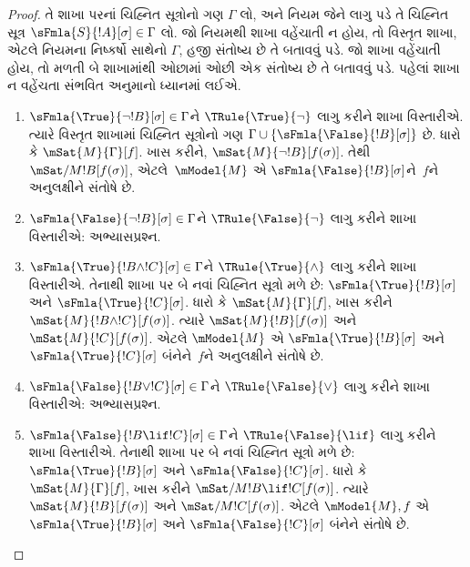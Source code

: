 \begin{proof}
તે શાખા પરનાં ચિહ્નિત સૂત્રોનો ગણ $\Gamma$ લો, અને નિયમ
જેને લાગુ પડે તે ચિહ્નિત સૂત્ર
$\sFmla{S}{!A}[\sigma] \in \Gamma$ લો. જો નિયમથી શાખા
વહેંચાતી ન હોય, તો વિસ્તૃત શાખા, એટલે નિયમના નિષ્કર્ષો સાથેનો
$\Gamma$, હજી સંતોષ્ય છે તે બતાવવું પડે. જો શાખા વહેંચાતી
હોય, તો મળતી બે શાખામાંથી ઓછામાં ઓછી એક સંતોષ્ય છે તે બતાવવું
પડે.
પહેલાં શાખા ન વહેંચતા સંભવિત અનુમાનો ધ્યાનમાં લઈએ.
\begin{enumerate}
\item $\sFmla{\True}{\lnot !B}[\sigma] \in \Gamma$ને
  $\TRule{\True}{\lnot}$ લાગુ કરીને શાખા વિસ્તારીએ. ત્યારે
  વિસ્તૃત શાખામાં ચિહ્નિત સૂત્રોનો ગણ $\Gamma \cup
  \{\sFmla{\False}{!B}[\sigma]\}$ છે. ધારો કે
  $\mSat{M}{\Gamma}[f]$. ખાસ કરીને,
  $\mSat{M}{\lnot !B}[f(\sigma)]$. તેથી
  $\mSat/{M}{!B}[f(\sigma)]$, એટલે~$\mModel{M}$ એ
  $\sFmla{\False}{!B}[\sigma]$ને~$f$ને અનુલક્ષીને સંતોષે છે.
\item $\sFmla{\False}{\lnot !B}[\sigma] \in \Gamma$ને
  $\TRule{\False}{\lnot}$ લાગુ કરીને શાખા વિસ્તારીએ:
  અભ્યાસપ્રશ્ન.
\item $\sFmla{\True}{!B \land !C}[\sigma] \in \Gamma$ને
  $\TRule{\True}{\land}$ લાગુ કરીને શાખા વિસ્તારીએ. તેનાથી
  શાખા પર બે નવાં ચિહ્નિત સૂત્રો મળે છે:
  $\sFmla{\True}{!B}[\sigma]$ અને $\sFmla{\True}{!C}[\sigma]$.
  ધારો કે $\mSat{M}{\Gamma}[f]$, ખાસ કરીને
  $\mSat{M}{!B \land !C}[f(\sigma)]$. ત્યારે
  $\mSat{M}{!B}[f(\sigma)]$ અને $\mSat{M}{!C}[f(\sigma)]$.
  એટલે $\mModel{M}$ એ $\sFmla{\True}{!B}[\sigma]$ અને
  $\sFmla{\True}{!C}[\sigma]$ બંનેને~$f$ને અનુલક્ષીને સંતોષે છે.
\item $\sFmla{\False}{!B \lor !C}[\sigma] \in \Gamma$ને
  $\TRule{\False}{\lor}$ લાગુ કરીને શાખા વિસ્તારીએ:
  અભ્યાસપ્રશ્ન.
\item $\sFmla{\False}{!B \lif !C}[\sigma] \in \Gamma$ને
  $\TRule{\False}{\lif}$ લાગુ કરીને શાખા વિસ્તારીએ. તેનાથી
  શાખા પર બે નવાં ચિહ્નિત સૂત્રો મળે છે:
  $\sFmla{\True}{!B}[\sigma]$ અને
  $\sFmla{\False}{!C}[\sigma]$. ધારો કે
  $\mSat{M}{\Gamma}[f]$, ખાસ કરીને
  $\mSat/{M}{!B \lif !C}[f(\sigma)]$. ત્યારે
  $\mSat{M}{!B}[f(\sigma)]$ અને
  $\mSat/{M}{!C}[f(\sigma)]$. એટલે
  $\mModel{M}, f$ એ $\sFmla{\True}{!B}[\sigma]$ અને
  $\sFmla{\False}{!C}[\sigma]$ બંનેને સંતોષે છે.


\end{enumerate}
\end{proof}
